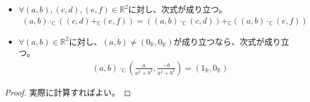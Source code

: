 \documentclass[dvipdfmx]{jsarticle}
\begin{document}
\begin{thm}
\begin{itemize}
\item
  $\forall(a,b),(c,d),(e,f) \in \mathbb{R}^{2}$に対し、次式が成り立つ。
\begin{align*}
(a,b) \cdot_{\mathbb{C}}\left( (c,d) +_{\mathbb{C}}(e,f) \right) = \left( (a,b) \cdot_{\mathbb{C}}(c,d) \right) +_{\mathbb{C}}\left( (a,b) \cdot_{\mathbb{C}}(e,f) \right)
\end{align*}
\item
  $\forall(a,b) \in \mathbb{R}^{2}$に対し、$(a,b) \neq \left( 0_{\mathbb{R}},0_{\mathbb{R}} \right)$が成り立つなら、次式が成り立つ。
\begin{align*}
(a,b) \cdot_{\mathbb{C}}\left( \frac{a}{a^{2} + b^{2}},\frac{- b}{a^{2} + b^{2}} \right) = \left( 1_{\mathbb{R}},0_{\mathbb{R}} \right)
\end{align*}
\end{itemize}
\end{thm}
\begin{proof}
実際に計算すればよい。
\end{proof}
\end{document}
